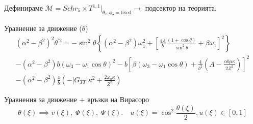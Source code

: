 \documentclass[bulg]{beamer}
\begin{document}
\begin{frame}
  Дефинираме $\mathcal{M}={Schr_5\times T^{1,1}}\Big\vert_{\theta_2,\phi_2
  = \text{fixed}} \rightarrow$ подсектор на теорията.
 
  \begin{alertblock}{Уравнение за движение ($\theta$)}
    \vspace{-0.5cm}
\begin{multline*}
\left(\alpha^{2}-\beta^{2}\right)^{2} \theta^{\prime 2}=-\sin ^{2} \theta\left\{\left(\alpha^{2}-\beta^{2}\right) \omega_{1}^{2}+\left[\frac{4 A}{b} \frac{(1+\cos \theta)}{\sin ^{2} \theta}+\beta \omega_{1}\right]^{2}\right\} \\
-\left(\alpha^{2}-\beta^{2}\right) b\left(\omega_{3}-\omega_{1} \cos \theta\right)^{2}-b\left[\beta\left(\omega_{3}-\omega_{1} \cos \theta\right)+\frac{4}{b^{2}}\left(A-\frac{\alpha b \mu \kappa}{2 Z^{2}}\right)\right]^{2} \\
-\left(\alpha^{2}-\beta^{2}\right) \frac{4}{b}\left(-\left|G_{T T}\right| \kappa^{2}+\frac{2 \omega_{0} \kappa}{Z^{2}}\right)
\label{eq:equiationfortheta}
\end{multline*}
\end{alertblock}
\begin{exampleblock}{Уравнения за движение + връзки на Вирасоро}
\begin{equation*}
  \theta(\xi) \implies v(\xi),\; \Phi(\xi),\; \Psi(\xi). \quad u(\xi) = \cos^2\frac{\theta(\xi)}{2}, u(\xi) \in \left[0,1\right]
\end{equation*}
\end{exampleblock}
\end{frame}
\end{document}
